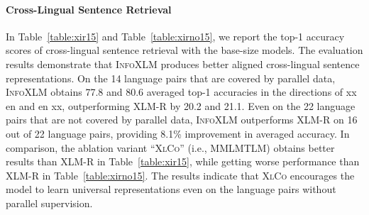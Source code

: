 \documentclass[11pt,a4paper]{article}
\newcommand\our{\textsc{InfoXLM}}
\newcommand\xlco{\textsc{XlCo}}
\begin{document}
\paragraph{Cross-Lingual Sentence Retrieval}
In Table~\ref{table:xir15} and Table~\ref{table:xirno15}, we report the top-1 accuracy scores of cross-lingual sentence retrieval with the base-size models.
The evaluation results demonstrate that \our{} produces better aligned cross-lingual sentence representations.
On the 14 language pairs that are covered by parallel data, \our{} obtains 77.8 and 80.6 averaged top-1 accuracies in the directions of xx  en and en  xx, outperforming XLM-R by 20.2 and 21.1.
Even on the 22 language pairs that are not covered by parallel data, \our{} outperforms XLM-R on 16 out of 22 language pairs, providing 8.1\% improvement in averaged accuracy.
In comparison, the ablation variant ``\xlco{}'' (i.e., MMLMTLM) obtains better results than XLM-R in Table~\ref{table:xir15}, while getting worse performance than XLM-R in Table~\ref{table:xirno15}.
The results indicate that \xlco{} encourages the model to learn universal representations even on the language pairs without parallel supervision.
\end{document}
